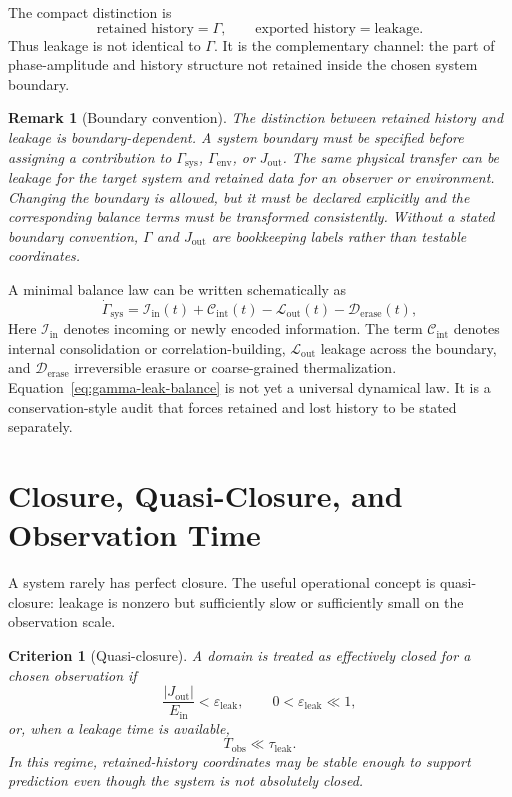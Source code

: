 \documentclass[11pt,a4paper]{article}
\newtheorem{criterion}{Criterion}
\newtheorem{remark}{Remark}
\newcommand{\Ghist}{\Gamma}
\newcommand{\Jout}{J_{\mathrm{out}}}
\newcommand{\taul}{\tau_{\mathrm{leak}}}
\newcommand{\Tobs}{T_{\mathrm{obs}}}
\begin{document}
The compact distinction is
\begin{equation}
  \text{retained history} = \Ghist,
  \qquad
  \text{exported history} = \text{leakage}.
  \label{eq:retained-exported}
\end{equation}
Thus leakage is not identical to \(\Ghist\).  It is the complementary channel: the part of phase-amplitude and history structure not retained inside the chosen system boundary.

\begin{remark}[Boundary convention]
The distinction between retained history and leakage is boundary-dependent.  A system boundary must be specified before assigning a contribution to \(\Ghist_{\mathrm{sys}}\), \(\Ghist_{\mathrm{env}}\), or \(\Jout\).  The same physical transfer can be leakage for the target system and retained data for an observer or environment.  Changing the boundary is allowed, but it must be declared explicitly and the corresponding balance terms must be transformed consistently.  Without a stated boundary convention, \(\Ghist\) and \(\Jout\) are bookkeeping labels rather than testable coordinates.
\end{remark}

A minimal balance law can be written schematically as
\begin{equation}
  \dot\Ghist_{\mathrm{sys}}
  =\mathcal{I}_{\mathrm{in}}(t)
  +\mathcal{C}_{\mathrm{int}}(t)
  -\mathcal{L}_{\mathrm{out}}(t)
  -\mathcal{D}_{\mathrm{erase}}(t),
  \label{eq:gamma-leak-balance}
\end{equation}
Here \(\mathcal{I}_{\mathrm{in}}\) denotes incoming or newly encoded information.  The term \(\mathcal{C}_{\mathrm{int}}\) denotes internal consolidation or correlation-building, \(\mathcal{L}_{\mathrm{out}}\) leakage across the boundary, and \(\mathcal{D}_{\mathrm{erase}}\) irreversible erasure or coarse-grained thermalization.  Equation~\eqref{eq:gamma-leak-balance} is not yet a universal dynamical law.  It is a conservation-style audit that forces retained and lost history to be stated separately.

\section{Closure, Quasi-Closure, and Observation Time}
A system rarely has perfect closure.  The useful operational concept is quasi-closure: leakage is nonzero but sufficiently slow or sufficiently small on the observation scale.

\begin{criterion}[Quasi-closure]
A domain is treated as effectively closed for a chosen observation if
\begin{equation}
  \frac{|\Jout|}{E_{\mathrm{in}}}<\varepsilon_{\mathrm{leak}},
  \qquad
  0<\varepsilon_{\mathrm{leak}}\ll1,
  \label{eq:leak-tolerance}
\end{equation}
or, when a leakage time is available,
\begin{equation}
  \Tobs\ll\taul.
  \label{eq:obs-vs-leak}
\end{equation}
In this regime, retained-history coordinates may be stable enough to support prediction even though the system is not absolutely closed.
\end{criterion}
\end{document}
